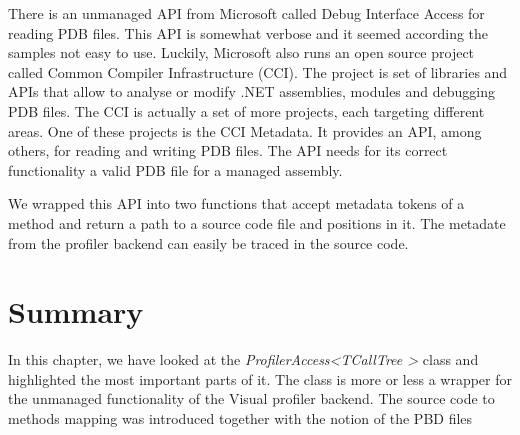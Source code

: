 There is an unmanaged API from Microsoft called Debug Interface Access for reading PDB files. This API is somewhat verbose and it seemed according the samples not easy to use. Luckily, Microsoft also runs an open source project called Common Compiler Infrastructure (CCI). The project is set of libraries and APIs that allow to analyse or modify .NET assemblies, modules and debugging PDB files. The CCI is actually a set of more projects, each targeting different areas. One of these projects is the CCI Metadata. It provides an API, among others, for reading and writing PDB files. The API needs for its correct functionality a valid PDB file for a managed assembly.

We wrapped this API into two functions that accept metadata tokens of a method and return a path to a source code file and positions in it. The metadate from the profiler backend can easily be traced in the source code. 


\section{Summary}
In this chapter, we have looked at the \textit{ProfilerAccess\textless TCallTree \textgreater} class and highlighted the most important parts of it. The class is more or less a wrapper for the unmanaged functionality of the Visual profiler backend. The source code to methods mapping was introduced together with the notion of the PBD files